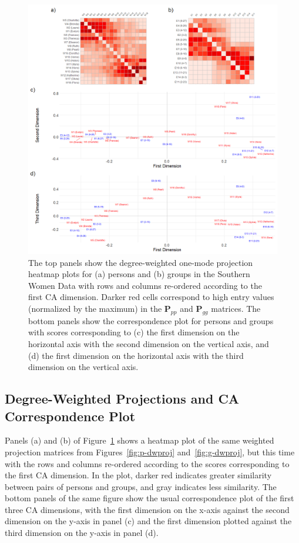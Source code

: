 \documentclass[a4paper,fleqn]{cas-sc}
\begin{document}
\begin{figure}[ht!]
    \captionsetup[subfigure]{font=footnotesize,labelfont=footnotesize}
    \centering
        \includegraphics[width=1.0\textwidth]{Plots/ca-corr-plot.png}
    \caption{The top panels show the degree-weighted one-mode projection heatmap plots for (a) persons and (b) groups in the Southern Women Data with rows and columns re-ordered according to the first CA dimension. Darker red cells correspond to high entry values (normalized by the maximum) in the $\mathbf{P}_{pp}$ and $\mathbf{P}_{gg}$ matrices. The bottom panels show the correspondence plot for persons and groups with scores corresponding to (c) the first dimension on the horizontal axis with the second dimension on the vertical axis, and (d) the first dimension on the horizontal axis with the third dimension on the vertical axis.}
    \label{fig:ca}
\end{figure}

\subsection{Degree-Weighted Projections and CA Correspondence Plot} \label{subsec:caplot}
Panels (a) and (b) of Figure~\ref{fig:ca} shows a heatmap plot of the same weighted projection matrices from Figures~\ref{fig:p-dwproj} and~\ref{fig:g-dwproj}, but this time with the rows and columns re-ordered according to the scores corresponding to the first CA dimension. In the plot, darker red indicates greater similarity between pairs of persons and groups, and gray indicates less similarity. The bottom panels of the same figure show the usual correspondence plot of the first three CA dimensions, with the first dimension on the x-axis against the second dimension on the y-axis in panel (c) and the first dimension plotted against the third dimension on the y-axis in panel (d). 
\end{document}
